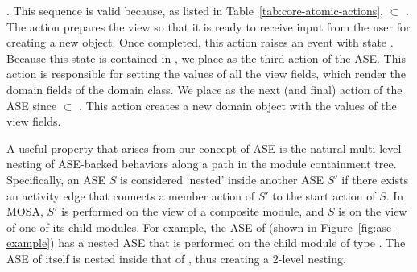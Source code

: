 \noindent {}. This sequence is valid because, as listed in Table~\ref{tab:core-atomic-actions},  $\subset$ . 
%
The  action prepares the view so that it is ready to receive input from the user for creating a new object. Once completed, this action raises an event with state . Because this state is contained in , we place  as the third action of the ASE. This action is responsible for setting the values of all the view fields, which render the domain fields of the domain class. 
%
We place  as the next (and final) action of the ASE since  $\subset$ . This action creates a new domain object with the values of the view fields.


A useful property that arises from our concept of ASE is the natural multi-level nesting of ASE-backed behaviors along a path in the module containment tree. Specifically, an ASE $S$ is considered `nested' inside another ASE $S'$ if there exists an activity edge that connects a member action of $S'$ to the start action of $S$. In MOSA, $S'$ is performed on the view of a composite module, and $S$ is on the view of one of its child modules. 
%
For example, the ASE of  (shown in Figure~\ref{fig:ase-example}) has a nested ASE that is performed on the child module of type . The ASE of  itself is nested inside that of , thus creating a 2-level nesting.


